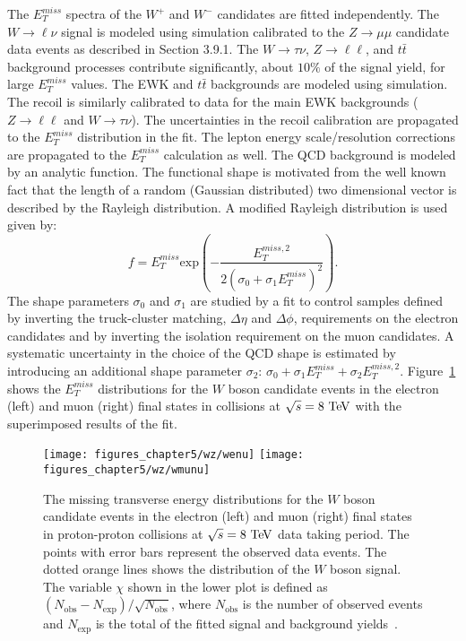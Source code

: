 The $E_{T}^{miss}$ spectra of the $W^{+}$ and $W^{-}$ candidates are fitted independently. The $W \rightarrow \ell \nu$ signal is modeled using simulation calibrated to the $Z \rightarrow \mu\mu$ candidate data events as described in Section 3.9.1. The $W \rightarrow \tau \nu$, $Z \rightarrow \ell\ell$, and $t\bar{t}$ background processes contribute significantly, about $10\%$ of the signal yield, for large $E_{T}^{miss}$ values. The EWK and $t\bar{t}$ backgrounds are modeled using simulation.  The recoil is similarly calibrated to data for the main EWK backgrounds ($Z \rightarrow \ell\ell$ and $W \rightarrow \tau \nu$). The uncertainties in the recoil calibration are propagated to the $E_{T}^{miss}$ distribution in the fit. The lepton energy scale/resolution corrections are propagated to the  $E_{T}^{miss}$ calculation as well. The QCD background is modeled by an analytic function. The functional shape is motivated from the well known fact that the length of a random (Gaussian distributed) two dimensional vector is described by the Rayleigh distribution. A modified Rayleigh distribution is used given by:
\begin{equation} \label{eq:rayleigh}
f = E_{T}^{miss} \mathrm{exp} \left(-\frac{E_{T}^{miss,2}}{2(\sigma_0+\sigma_1E_{T}^{miss})^2} \right).
\end{equation}  
The shape parameters $\sigma_0$ and $\sigma_1$ are studied by a fit to control samples defined by inverting the  truck-cluster matching,  $\Delta \eta$ and $\Delta \phi$, requirements on the electron candidates and by inverting the isolation requirement on the muon candidates. A systematic uncertainty in the choice of the QCD shape is estimated by introducing an additional shape parameter $\sigma_2$: $\sigma_0+\sigma_1E_{T}^{miss}+\sigma_2E_{T}^{miss,2}$. Figure~\ref{fig:W8} shows the $E_{T}^{miss}$ distributions for the  $W$ boson candidate events in the electron (left) and muon (right) final states in collisions at $\sqrt{s}=8~\mathrm{Te\kern -0.1em V}$ with the superimposed results of the fit.     
\begin{figure}[htbp]
\centering
\texttt{[image: figures\_chapter5/wz/wenu]}
\texttt{[image: figures\_chapter5/wz/wmunu]}
\caption{The missing transverse energy distributions for the $W$  boson candidate events in the electron (left) and muon (right) final states in proton-proton collisions at $\sqrt{s}=8~\mathrm{Te\kern -0.1em V}$ data taking period.  The points with error bars represent the observed data events. The dotted orange lines shows the distribution of the $W$ boson signal. The variable $\chi$ shown in the lower plot is defined as $(N_{\text{obs}}-N_{\text{exp}})/\sqrt{N_{\text{obs}}}$, where $N_{\text{obs}}$ is the number of observed events and $N_{\text{exp}}$ is the total of the fitted signal and background yields~\cite{Chatrchyan:2014mua}.
\label{fig:W8}}
\end{figure}
